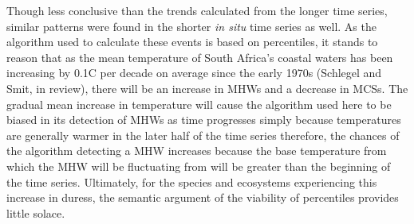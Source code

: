 \documentclass[a4paper,10pt,review]{elsarticle}
\begin{document}
Though less conclusive than the trends calculated from the longer time series, similar patterns were found in the shorter \emph{in situ} time series as well. As the algorithm used to calculate these events is based on percentiles, it stands to reason that as the mean temperature of South Africa's coastal waters has been increasing by 0.1\degree C per decade on average since the early 1970s (Schlegel and Smit, in review), there will be an increase in MHWs and a decrease in MCSs. The gradual mean increase in temperature will cause the algorithm used here to be biased in its detection of MHWs as time progresses simply because temperatures are generally warmer in the later half of the time series therefore, the chances of the algorithm detecting a MHW increases because the base temperature from which the MHW will be fluctuating from will be greater than the beginning of the time series. Ultimately, for the species and ecosystems experiencing this increase in duress, the semantic argument of the viability of percentiles provides little solace.
\end{document}
